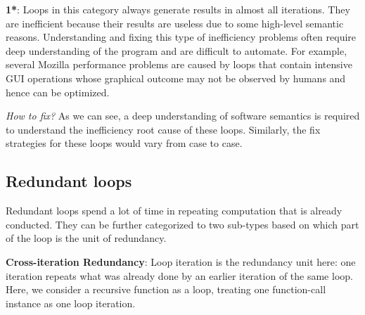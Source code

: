 {\textbf{1*}}:
Loops in this category always generate results in almost all iterations. 
They are inefficient because their results are useless due to
some high-level semantic reasons.
Understanding and fixing this type of inefficiency problems often require
deep understanding of the program and are difficult to automate.
For example, several Mozilla performance problems are caused by 
loops that contain intensive GUI operations whose graphical outcome may not
be observed by humans and hence can be optimized.

{\textit{How to fix?}}
As we can see, a deep understanding of software semantics is required
to understand the inefficiency root cause of these loops.
Similarly, the fix strategies for these loops would vary from case to case.

\subsection{Redundant loops}
\label{sec:study_redundant}

Redundant loops spend a lot of time in repeating computation that is already
conducted. They can be further categorized to two sub-types
based on which part of the loop is the unit of redundancy.




{\textbf{Cross-iteration Redundancy}}:
Loop iteration is the redundancy unit here:
one iteration repeats
what was already done by an earlier iteration of the same loop.
Here, we consider a recursive function as a loop, treating one function-call
instance as one loop iteration. 

